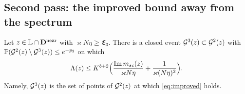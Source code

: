 \subsection{Second pass: the improved bound away from the spectrum}
\begin{proposition}\label{prop:S3}
Let $z\in\mathbb L\cap\mathbf{D}^{\rm near}$ with $\varkappa N\eta\ge\mathfrak E_3$. There is a closed event $\mathcal{G}^3(z)\subset\mathcal{G}^2(z)$ with $\mathbb{P}(\mathcal{G}^2(z)\setminus\mathcal{G}^3(z))\le e^{-p_2}$ on which
\begin{equation}\label{eq:improved}
 \Lambda(z)\le K^{b+2}\Big(\frac{\operatorname{Im}m_{sc}(z)}{\varkappa N\eta}+\frac1{\varkappa(N\eta)^2}\Big).
\end{equation}
Namely, $\mathcal{G}^3(z)$ is the set of points of $\mathcal{G}^2(z)$ at which \eqref{eq:improved} holds.
\end{proposition}
